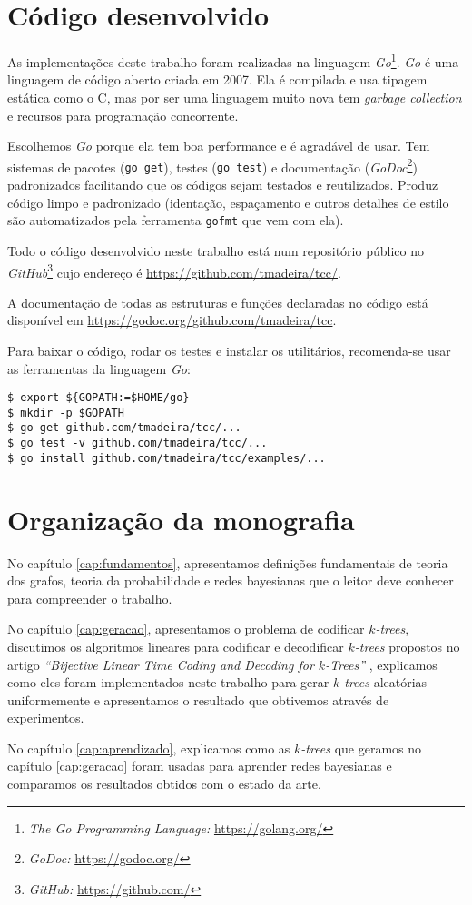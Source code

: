 \section{Código desenvolvido}

As implementações deste trabalho foram realizadas na linguagem \emph{Go}\footnote{\emph{The Go Programming Language:} \url{https://golang.org/}}. \emph{Go} é uma linguagem de código aberto criada em 2007. Ela é compilada e usa tipagem estática como o C, mas por ser uma linguagem muito nova tem \emph{garbage collection} e recursos para programação concorrente.

Escolhemos \emph{Go} porque ela tem boa performance e é agradável de usar. Tem sistemas de pacotes ({\tt go get}), testes ({\tt go test}) e documentação (\emph{GoDoc}\footnote{\emph{GoDoc:} \url{https://godoc.org/}}) padronizados facilitando que os códigos sejam testados e reutilizados. Produz código limpo e padronizado (identação, espaçamento e outros detalhes de estilo são automatizados pela ferramenta {\tt gofmt} que vem com ela).

Todo o código desenvolvido neste trabalho está num repositório público no \emph{GitHub}\footnote{\emph{GitHub:} \url{https://github.com/}} cujo endereço é \url{https://github.com/tmadeira/tcc/}.

A documentação de todas as estruturas e funções declaradas no código está disponível em \url{https://godoc.org/github.com/tmadeira/tcc}.

Para baixar o código, rodar os testes e instalar os utilitários, recomenda-se usar as ferramentas da linguagem \emph{Go}:

\begin{lstlisting}
$ export ${GOPATH:=$HOME/go}
$ mkdir -p $GOPATH
$ go get github.com/tmadeira/tcc/...
$ go test -v github.com/tmadeira/tcc/...
$ go install github.com/tmadeira/tcc/examples/...
\end{lstlisting}

\section{Organização da monografia}

No capítulo \ref{cap:fundamentos}, apresentamos definições fundamentais de teoria dos grafos, teoria da probabilidade e redes bayesianas que o leitor deve conhecer para compreender o trabalho.

No capítulo \ref{cap:geracao}, apresentamos o problema de codificar \emph{$k$-trees}, discutimos os algoritmos lineares para codificar e decodificar \emph{$k$-trees} propostos no artigo \emph{``Bijective Linear Time Coding and Decoding for $k$-Trees''} \cite{caminiti}, explicamos como eles foram implementados neste trabalho para gerar \emph{$k$-trees} aleatórias uniformemente e apresentamos o resultado que obtivemos através de experimentos.

No capítulo \ref{cap:aprendizado}, explicamos como as \emph{$k$-trees} que geramos no capítulo \ref{cap:geracao} foram usadas para aprender redes bayesianas e comparamos os resultados obtidos com o estado da arte.
